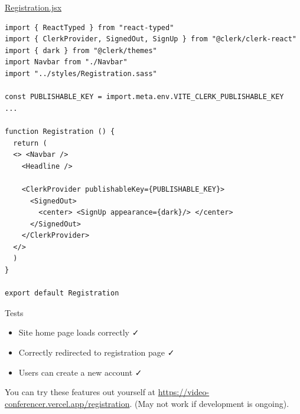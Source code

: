 \underline{Registration.jsx}
\begin{verbatim}
import { ReactTyped } from "react-typed"
import { ClerkProvider, SignedOut, SignUp } from "@clerk/clerk-react"
import { dark } from "@clerk/themes"
import Navbar from "./Navbar" 
import "../styles/Registration.sass"

const PUBLISHABLE_KEY = import.meta.env.VITE_CLERK_PUBLISHABLE_KEY
...

function Registration () {
  return (
  <> <Navbar />
    <Headline />
    
    <ClerkProvider publishableKey={PUBLISHABLE_KEY}>
      <SignedOut>
        <center> <SignUp appearance={dark}/> </center>
      </SignedOut>
    </ClerkProvider>
  </>
  )
}

export default Registration
\end{verbatim}

{\color{gray} \hrulefill}
\vspace{0.2cm}

{\sffamily Tests}
\begin{itemize}
  \item Site home page loads correctly \faCheck \\
  \item Correctly redirected to registration page \faCheck \\
  \item Users can create a new account \faCheck \\
\end{itemize}

{\color{gray} \hrulefill}
\vspace{0.2cm}

You can try these features out yourself at \url{https://video-conferencer.vercel.app/registration}.
(May not work if development is ongoing).
